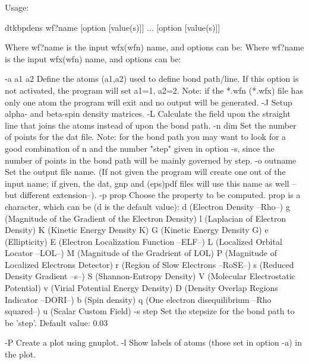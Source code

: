 

Usage:

	dtkbpdens wf?name [option [value(s)]] ... [option [value(s)]]

Where wf?name is the input wfx(wfn) name, and options can be:
Where wf?name is the input wfx(wfn) name, and options can be:

  -a a1 a2  	Define the atoms  (a1,a2) used to define bond path/line.
            	  If this option is not activated, the program will 
            	  set a1=1, a2=2.
            	  Note: if the *.wfn (*.wfx) file has only one atom
            	  the program will exit and no output will be generated.
  -J        	Setup alpha- and beta-spin density matrices.
  -L        	Calculate the field upon the straight line that joins the atoms
            	  instead of upon the bond path.
  -n  dim   	Set the number of points for the dat file.
            	  Note: for the bond path you may want to look for a good 
            	  combination of n and the number "step" given in option -s,
            	  since the number of points in the bond path will be mainly 
            	  governed by step.
  -o outname	Set the output file name.
            	  (If not given the program will create one out of
            	  the input name; if given, the dat, gnp and (eps)pdf files will
            	  use this name as well --but different extension--).
  -p prop   	Choose the property to be computed. prop is a character,
            	  which can be (d is the default value): 
         		d (Electron Density --Rho--)
         		g (Magnitude of the Gradient of the Electron Density)
         		l (Laplacian of Electron Density)
         		K (Kinetic Energy Density K)
         		G (Kinetic Energy Density G)
         		e (Ellipticity)
         		E (Electron Localization Function --ELF--)
         		L (Localized Orbital Locator --LOL--)
         		M (Magnitude of the Gradrient of LOL)
         		P (Magnitude of Localized Electrons Detector)
         		r (Region of Slow Electrons --RoSE--)
         		s (Reduced Density Gradient --s--)
         		S (Shannon-Entropy Density)
         		V (Molecular Electrostatic Potential)
         		v (Virial Potential Energy Density)
         		D (Density Overlap Regions Indicator --DORI--)
         		b (Spin density)
         		q (One electron disequilibrium --Rho squared--)
         		u (Scalar Custom Field)
  -s step   	Set the stepsize for the bond path to be 'step'.
            	  Default value: 0.03

  -P     	Create a plot using gnuplot.
  -l     	Show labels of atoms (those set in option -a) in the plot.

